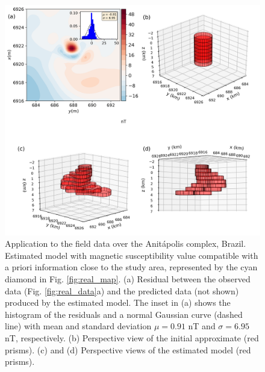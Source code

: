 \begin{figure}
    \centering
    \includegraphics[scale=.5]{figures/real_results.png}
    \caption{Application to the field data over the Anitápolis complex, Brazil.
    Estimated model with magnetic susceptibility value compatible with 
    a priori information close to the study area, 
    represented by the cyan diamond in Fig. \ref{fig:real_map}. 
    (a) Residual between the observed data (Fig. \ref{fig:real_data}a) and the 
    predicted data (not shown) produced by the estimated model. 
    The inset in (a) shows the histogram of the residuals and a normal 
    Gaussian curve (dashed line) with mean and standard deviation 
    $\mu = 0.91$ nT and $\sigma = 6.95$ nT, respectively. 
    (b) Perspective view of the initial approximate (red prisms). 
    (c) and (d) Perspective views of the estimated model (red prisms).}
    \label{fig:real_result}
\end{figure}
